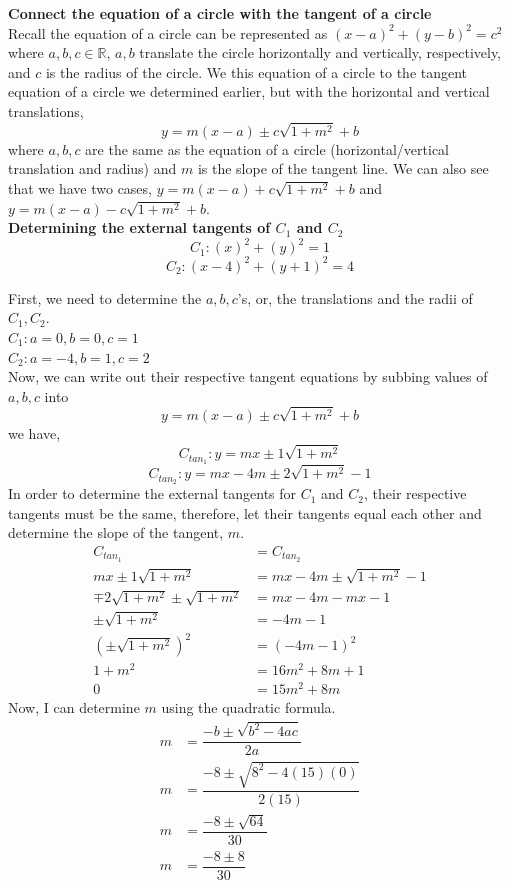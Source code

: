 \documentclass[12pt]{book}
\begin{document}
\begin{enumerate}
\textbf{Connect the equation of a circle with the tangent of a circle}\\
Recall the equation of a circle can be represented as $(x-a)^2 + (y-b)^2 = c^2$ where $a,b,c \in \mathbb{R}$, $a,b$ translate the circle horizontally and vertically, respectively, and $c$ is the radius of the circle. We this equation of a circle to the tangent equation of a circle we determined earlier, but with the horizontal and vertical translations,
$$y = m(x-a) \pm c\sqrt{1+m^2} + b$$
where $a,b,c$ are the same as the equation of a circle (horizontal/vertical translation and radius) and $m$ is the slope of the tangent line. We can also see that we have two cases, $y = m(x-a) + c\sqrt{1+m^2} + b$ and $y = m(x-a) - c\sqrt{1+m^2} + b$.\\

\textbf{Determining the external tangents of $C_1$ and $C_2$}\\
$$C_1: \left(x\right)^{2}+\left(y\right)^{2}=1$$
$$C_2: \left(x-4\right)^{2}+\left(y+1\right)^{2}=4$$

First, we need to determine the $a, b, c$'s, or, the translations and the radii of $C_1, C_2$.\\
$C_1: a = 0, b = 0, c = 1$ \\
$C_2: a = -4, b = 1, c = 2$ \\

Now, we can write out their respective tangent equations by subbing values of $a,b,c$ into $$y = m(x-a) \pm c\sqrt{1+m^2} + b$$
we have,
$$C_{tan_1}: y = mx \pm 1\sqrt{1+m^2}$$ 
$$C_{tan_2}: y = mx-4m \pm 2\sqrt{1+m^2}-1$$
In order to determine the external tangents for $C_1$ and $C_2$, their respective tangents must be the same, therefore, let their tangents equal each other and determine the slope of the tangent, $m$.
\setcounter{equation}{0}
\begin{align}
    C_{tan_1} &= C_{tan_2} \\
    mx \pm 1\sqrt{1+m^2} &= mx-4m \pm \sqrt{1+m^2} - 1 \\
    \mp 2\sqrt{1+m^2} \pm \sqrt{1+m^2} &= mx-4m -mx - 1 \\
    \pm \sqrt{1+m^2} &= -4m - 1 \\
    \left(\pm \sqrt{1+m^2}\right)^2 &= (-4m - 1)^2 \\
    1+m^2 &= 16m^2 + 8m + 1\\
    0 &= 15m^2 + 8m
\end{align}
Now, I can determine $m$ using the quadratic formula.
\begin{align}
    m &= \dfrac{-b \pm \sqrt{b^2 -4ac}}{2a} \\
    m &= \dfrac{-8 \pm \sqrt{8^2 - 4(15)(0)}}{2(15)} \\
    m &= \dfrac{-8 \pm \sqrt{64}}{30} \\
    m &= \dfrac{-8 \pm 8}{30}
\end{align}


\end{enumerate}
\end{document}
